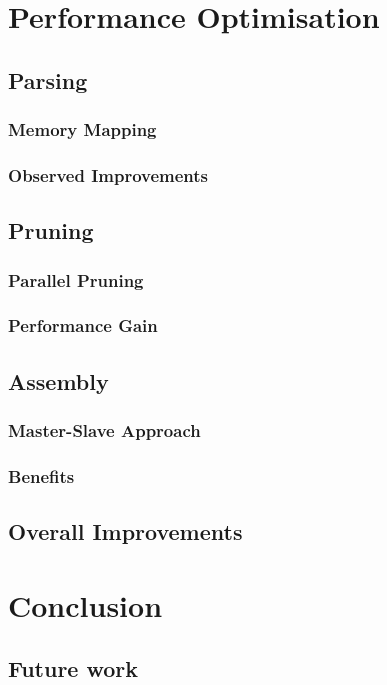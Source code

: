 \documentclass[plainarticle,zihtitle,english,final,hyperref,utf8]{zihpub}
\begin{document}
\section{Performance Optimisation}
\subsection{Parsing}
\subsubsection{Memory Mapping}
\subsubsection{Observed Improvements}
\subsection{Pruning}
\subsubsection{Parallel Pruning}
\subsubsection{Performance Gain}
\subsection{Assembly}
\subsubsection{Master-Slave Approach}
\subsubsection{Benefits}
\subsection{Overall Improvements}
\section{Conclusion}
\subsection{Future work}
\end{document}
